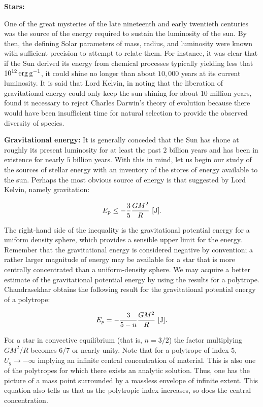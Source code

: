 \documentclass[a4paper,10pt]{article}
\begin{document}
{\noindent}\textbf{Stars:}

{\noindent}One of the great mysteries of the late nineteenth and early twentieth centuries was the source of the energy required to sustain the luminosity of the sun. By then, the defining Solar parameters of mass, radius, and luminosity were known with sufficient precision to attempt to relate them. For instance, it was clear that if the Sun derived its energy from chemical processes typically yielding less that $10^{12}\,{\rm erg\,g^{-1}}$, it could shine no longer than about $10,000$ years at its current luminosity. It is said that Lord Kelvin, in noting that the liberation of gravitational energy could only keep the sun shining for about $10$ million years, found it necessary to reject Charles Darwin's theory of evolution because there would have been insufficient time for natural selection to provide the observed diversity of species.

{\noindent}\textbf{Gravitational energy:} It is generally conceded that the Sun has shone at roughly its present luminosity for at least the past $2$ billion years and has been in existence for nearly $5$ billion years. With this in mind, let us begin our study of the sources of stellar energy with an inventory of the stores of energy available to the sun. Perhaps the most obvious source of energy is that suggested by Lord Kelvin, namely gravitation:

\begin{align*}
    E_p \leq -\frac{3}{5}\frac{GM^2}{R} ~ [{\rm J}].
\end{align*}

{\noindent}The right-hand side of the inequality is the gravitational potential energy for a uniform density sphere, which provides a sensible upper limit for the energy. Remember that the gravitational energy is considered negative by convention; a rather larger magnitude of energy may be available for a star that is more centrally concentrated than a uniform-density sphere. We may acquire a better estimate of the gravitational potential energy by using the results for a polytrope. Chandrasekhar obtains the following result for the gravitational potential energy of a polytrope:

\begin{align*}
    E_p = -\frac{3}{5-n}\frac{GM^2}{R} ~ [{\rm J}].
\end{align*}

{\noindent}For a star in convective equilibrium (that is, $n=3/2$) the factor multiplying $GM^2/R$ becomes $6/7$ or nearly unity. Note that for a polytrope of index $5$, $U_g\rightarrow-\infty$ implying an infinite central concentration of material. This is also one of the polytropes for which there exists an analytic solution. Thus, one has the picture of a mass point surrounded by a massless envelope of infinite extent. This equation also tells us that as the polytropic index increases, so does the central concentration.
\end{document}
